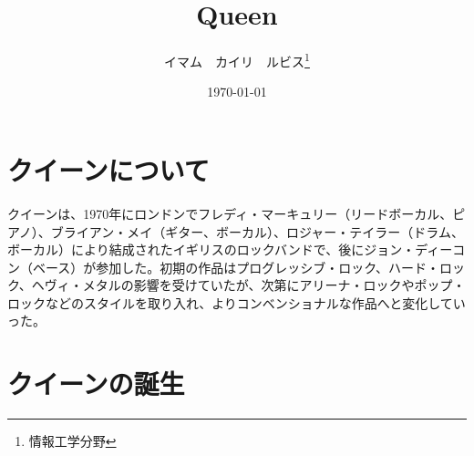 \documentclass[a4j, twocolumn]{jarticle}
\begin{document}
\title{Queen}
\author{イマム　カイリ　ルビス\thanks{情報工学分野}}
\date{\today}

\maketitle

\section{クイーンについて}

クイーンは、1970年にロンドンでフレディ・マーキュリー（リードボーカル、ピアノ）、ブライアン・メイ（ギター、ボーカル）、ロジャー・テイラー（ドラム、ボーカル）により結成されたイギリスのロックバンドで、後にジョン・ディーコン（ベース）が参加した。初期の作品はプログレッシブ・ロック、ハード・ロック、ヘヴィ・メタルの影響を受けていたが、次第にアリーナ・ロックやポップ・ロックなどのスタイルを取り入れ、よりコンベンショナルな作品へと変化していった。

\section{クイーンの誕生}




\end{document}

